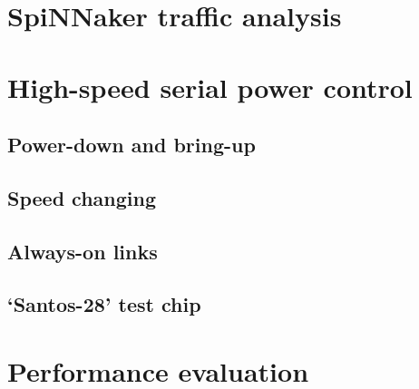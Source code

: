 	
	\section{SpiNNaker traffic analysis}
		
	
	\section{High-speed serial power control}
		
		
		\subsection{Power-down and bring-up}
			
		
		\subsection{Speed changing}
			
		
		\subsection{Always-on links}
			
		
		\subsection{`Santos-28' test chip}
			
	
	
	\section{Performance evaluation}
		
